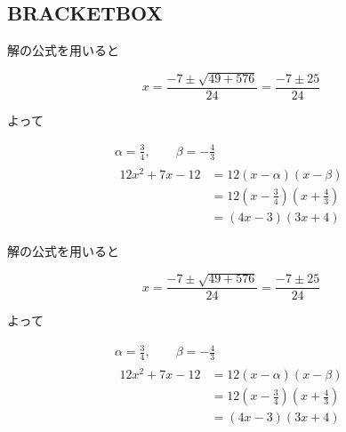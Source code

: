 \documentclass[../main]{subfiles}
\begin{document}
\subsection{BRACKETBOX}
\begin{BRACKETBOX}
    
    解の公式を用いると

    \begin{equation*}
        x = \frac{-7\pm\sqrt{49+576}}{24} = \frac{-7\pm25}{24}
    \end{equation*}

    よって

    \begin{gather*}
        \alpha = \frac{3}{4}, \qquad \beta = -\frac{4}{3} \\
        \begin{aligned}
            12x^2+7x-12 &= 12(x-\alpha)(x-\beta) \\
                    &= 12(x-\frac{3}{4})(x+\frac{4}{3}) \\
                    &= (4x-3)(3x+4)
        \end{aligned}
    \end{gather*}

\end{BRACKETBOX}
\begin{code}[language=tex]
\begin{BRACKETBOX}
    
    解の公式を用いると

    \begin{equation*}
        x = \frac{-7\pm\sqrt{49+576}}{24} = \frac{-7\pm25}{24}
    \end{equation*}

    よって

    \begin{gather*}
        \alpha = \frac{3}{4}, \qquad \beta = -\frac{4}{3} \\
        \begin{aligned}
            12x^2+7x-12 &= 12(x-\alpha)(x-\beta) \\
                    &= 12(x-\frac{3}{4})(x+\frac{4}{3}) \\
                    &= (4x-3)(3x+4)
        \end{aligned}
    \end{gather*}
\end{BRACKETBOX}
\end{code}

\leaderfill
\end{document}
